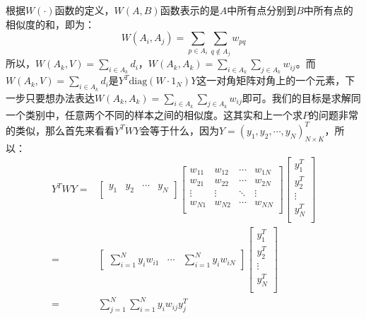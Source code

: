 \documentclass[a4paper]{article}
\begin{document}
根据$W(\cdot)$函数的定义，$W(A,B)$函数表示的是$A$中所有点分别到$B$中所有点的相似度的和，即为：
\begin{equation}
    W(A_i,A_j) = \sum_{p\in A_i} \sum_{q\notin A_j} w_{pq}
\end{equation}
所以，$ W(A_k,V) = \sum_{i\in A_k} d_i$，$W(A_k,A_k) = \sum_{i\in A_k} \sum_{j\in A_k} w_{ij}$。而$W(A_k,V) = \sum_{i\in A_k} d_i$是$ Y^T\mathrm{diag}(W\cdot 1_N)Y$这一对角矩阵对角上的一个元素，下一步只要想办法表达$W(A_k,A_k) = \sum_{i\in A_k} \sum_{j\in A_k} w_{ij}$即可。我们的目标是求解同一个类别中，任意两个不同的样本之间的相似度。这其实和上一个求$P$的问题非常的类似，那么首先来看看$Y^TWY$会等于什么，因为$Y = (y_1,y_2,\cdots,y_N)^T_{N\times K}$，所以：
\begin{equation}
    \begin{split}
        Y^TWY = &
        \begin{bmatrix}
        y_1 & y_2 & \cdots & y_N \\
        \end{bmatrix}
        \begin{bmatrix}
        w_{11} & w_{12} & \cdots & w_{1N} \\
        w_{21} & w_{22} & \cdots & w_{2N} \\
        \vdots & \vdots & \ddots & \vdots \\
        w_{N1} & w_{N2} & \cdots & w_{NN} \\
        \end{bmatrix}
        \begin{bmatrix}
        y_1^T \\ y_2^T \\ \vdots \\ y_N^T \\
        \end{bmatrix} \\
        = & 
        \begin{bmatrix}
        \sum_{i=1}^N y_iw_{i1} & \cdots & \sum_{i=1}^N y_iw_{iN}
        \end{bmatrix}
        \begin{bmatrix}
        y_1^T \\ y_2^T \\ \vdots \\ y_N^T \\
        \end{bmatrix} \\
        = & \sum_{j=1}^N \sum_{i=1}^N y_iw_{ij}y_j^T
    \end{split}
\end{equation}
\end{document}
